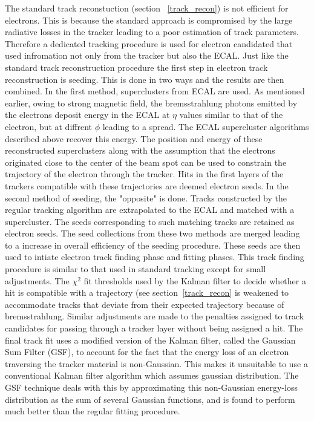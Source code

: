 The standard track reconstuction (section ~\ref{track_recon}) is not efficient for electrons. This is because the standard approach is compromised by the large radiative losses in the tracker leading to a poor estimation of track parameters. Therefore a dedicated tracking procedure is used for  electron candidated that used infromation not only from the tracker but also the ECAL. Just like the standard track reconstruction procedure the first step in electron track reconstruction is seeding. This is done in two ways and the results are then combined. In the first method, superclusters from ECAL are used. As mentioned earlier, owing to strong magnetic field, the bremsstrahlung photons emitted by the electrons deposit energy in the ECAL at $\eta$ values similar to that of the electron, but at diffrent $\phi$ leading to a spread. The ECAL supercluster algorithms described above recover this energy. The position and  energy of these reconstructed superclusters along with the assumption that the electrons originated close to the center of the beam spot can be used to constrain the trajectory of the electron through the tracker. Hits in the first layers of the trackers compatible with these trajectories are deemed electron seeds. In the second method of seeding, the "opposite" is done. Tracks constructed by the regular tracking algorithm are extrapolated to the ECAL and matched with a supercluster. The seeds corresponding to such matching tracks are retained as electron seeds. The seed collections from these two methods are merged leading to a increase in overall efficiency of the seeding procedure. These seeds are then used to intiate electron track finding phase and fitting phases. This track finding procedure is similar to that used in standard tracking except for small adjustments. The $\chi^2$ fit thresholds used by the Kalman filter to decide whether a hit is compatible with a trajectory (see section~\ref{track_recon} is weakened to accommodate tracks that deviate from their expected trajectory because of bremsstrahlung. Similar adjustments are made to the penalties assigned to track candidates for passing through a tracker layer without being assigned a hit. The final track fit uses a modified version of the Kalman filter, called the Gaussian Sum Filter (GSF), to account for the fact that the energy loss of an electron traversing the tracker material is non-Gaussian. This  makes it unsuitable to use a conventional Kalman filter algorithm which assumes gaussian distribution. The GSF technique deals with this by approximating this non-Gaussian energy-loss distribution as the sum of several Gaussian functions, and is found to perform much better than the regular fitting procedure.

